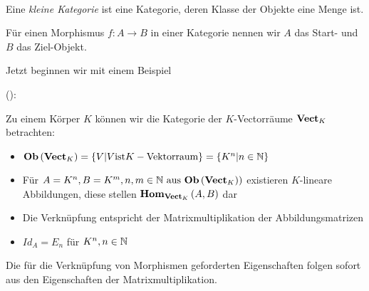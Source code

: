 \documentclass{article}
\renewcommand{\id}{\ensuremath{Id}}
\begin{document}
		\begin{defi} \cite[Definition 2.2.29]{Bra} \\
		Eine \emph{kleine Kategorie} ist eine Kategorie, deren Klasse der Objekte eine Menge ist.
		\end{defi}
		\begin{defi}  \cite[Bemerkung 2.2.25]{Bra}
		F\"ur einen Morphismus \( f: A \to B \) in einer Kategorie \CatC nennen wir \( A \) das Start- und \( B \) das Ziel-Objekt.
		\end{defi}
		
		Jetzt beginnen wir mit einem Beispiel

		\begin{bsp}
		
	(\cite[Beispiel 2.2.10]{Bra}):
		
		Zu einem K\"orper \( K \) k\"onnen wir die Kategorie der \( K\)-Vectorr\"aume \( \mathbf{Vect}_K \) betrachten:
		\begin{itemize}
			\item	\(  \mathbf{Ob}  \left( \mathbf{Vect}_K \right) = \left\lbrace V | V \text{ist} K-\text{Vektorraum} \right\rbrace  = \left\lbrace K^n | n \in \mathbb{N} \right\rbrace \)
			\item F\"ur  \( A=K^n , B =K^m , n,m \in \BN \ \text{aus} \ \Ob \left( \CatVect_K) \right) \) existieren $K$-lineare Abbildungen, diese stellen \(  \mathbf{Hom } _{\mathbf{Vect}_K}\left( A,B \right) \) dar
			\item Die Verkn\"upfung entspricht der Matrixmultiplikation der Abbildungsmatrizen 
			\item \( \id_A = E_n \) f\"ur \( K^n , n \in \mathbb{N} \)
		 \end{itemize}
		 Die f\"ur die Verkn\"upfung von Morphismen geforderten Eigenschaften folgen sofort aus den Eigenschaften der Matrixmultiplikation.
		 \end{bsp}
		 	 
\end{document}
